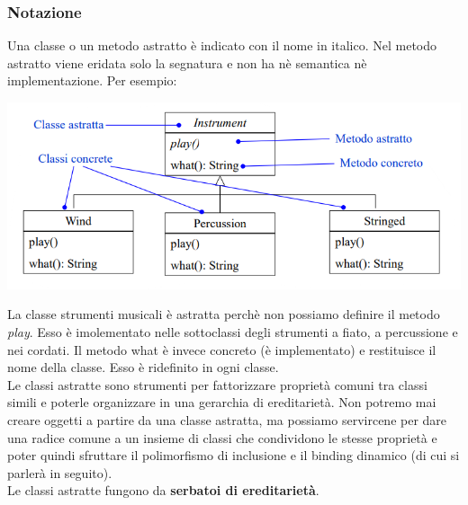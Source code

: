 \documentclass{article}
\begin{document}
	\subsubsection{Notazione}
	Una classe o un metodo astratto è indicato con il nome in italico. Nel metodo astratto viene eridata solo la segnatura e non ha nè semantica nè implementazione. Per esempio:
	\begin{center}
		\includegraphics[scale=0.5]{assets/classi_astratte_notazione.png}
	\end{center}
	La classe strumenti musicali è astratta perchè non possiamo definire il metodo \textit{play}. Esso è imolementato nelle sottoclassi degli strumenti a fiato, a percussione e nei cordati. Il metodo what è invece concreto (è implementato) e restituisce il nome della classe. Esso è ridefinito in ogni classe.
	\vspace{\baselineskip} \\
	Le classi astratte sono strumenti per fattorizzare proprietà comuni tra classi simili e poterle organizzare in una gerarchia di ereditarietà. Non potremo mai creare oggetti a partire da una classe astratta, ma possiamo servircene per dare una radice comune a un insieme di classi che condividono le stesse proprietà e poter quindi sfruttare il polimorfismo di inclusione e il binding dinamico (di cui si parlerà in seguito). \\
	Le classi astratte fungono da \textbf{serbatoi di ereditarietà}.
\end{document}
